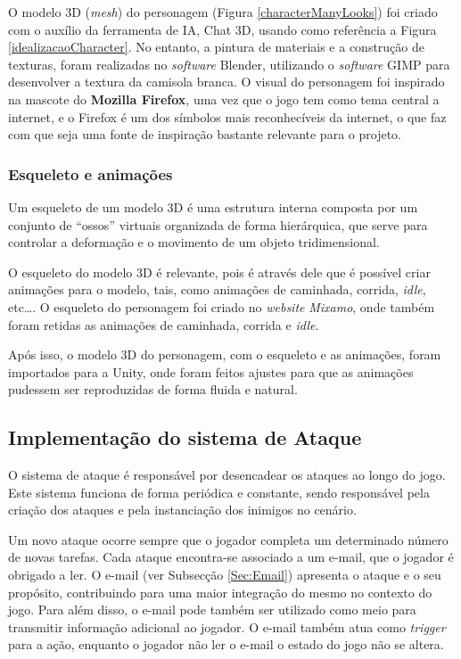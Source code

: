 O modelo 3D (\textit{mesh}) do personagem (Figura \ref{characterManyLooks}) foi criado com o auxílio da ferramenta de \ac{IA}, Chat 3D, usando como referência a Figura \ref{idealizacaoCharacter}. No entanto, a pintura de materiais e a construção de texturas, foram realizadas no \textit{software} Blender, utilizando o \textit{software} GIMP para desenvolver a textura da camisola branca.
O visual do personagem foi inspirado na mascote do \textbf{Mozilla Firefox}, uma vez que o jogo tem como tema central a internet, e o Firefox é um dos símbolos mais reconhecíveis da internet, o que faz com que seja uma fonte de inspiração bastante relevante para o projeto.

\subsubsection{Esqueleto e animações}

Um esqueleto de um modelo 3D é uma estrutura interna composta por um conjunto de “ossos” virtuais organizada de forma hierárquica, que serve para controlar a deformação e o movimento de um objeto tridimensional.

O esqueleto do modelo 3D é relevante, pois é através dele que é possível criar animações para o modelo, tais, como animações de caminhada, corrida, \textit{idle}, etc\dots.
O esqueleto do personagem foi criado no \textit{website} \textit{Mixamo}, onde também foram retidas as animações de caminhada, corrida e \textit{idle}. 

Após isso, o modelo 3D do personagem, com o esqueleto e as animações, foram importados para a Unity, onde foram feitos ajustes para que as animações pudessem ser reproduzidas de forma fluida e natural.

\subsection{Implementação do sistema de Ataque}
\label{Sec:ImplementSistemaAtaque}

O sistema de ataque é responsável por desencadear os ataques ao longo do jogo. Este sistema funciona de forma periódica e constante, sendo responsável pela criação dos ataques e pela instanciação dos inimigos no cenário.

Um novo ataque ocorre sempre que o jogador completa um determinado número de novas tarefas. Cada ataque encontra-se associado a um e-mail, que o jogador é obrigado a ler. O e-mail (ver Subsecção \ref{Sec:Email}) apresenta o ataque e o seu propósito, contribuindo para uma maior integração do mesmo no contexto do jogo. Para além disso, o e-mail pode também ser utilizado como meio para transmitir informação adicional ao jogador. O e-mail também atua como \textit{trigger} para a ação, enquanto o jogador não ler o e-mail o estado do jogo não se altera.

